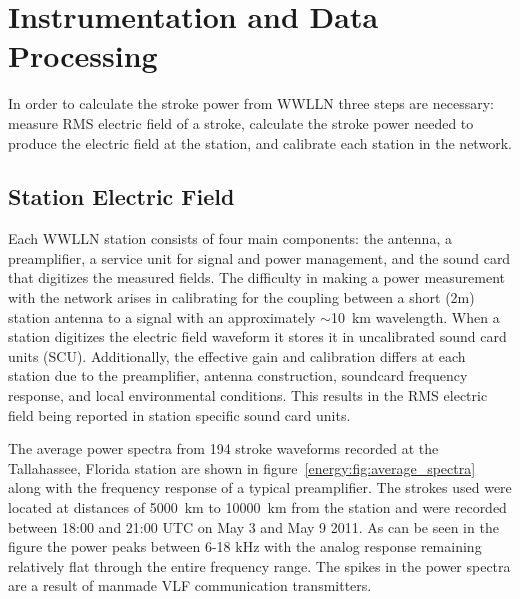 \section{Instrumentation and Data Processing}

In order to calculate the stroke power from WWLLN three steps are necessary: measure RMS electric field of a stroke, calculate the stroke power needed to produce the electric field at the station, and calibrate each station in the network.

\subsection{Station Electric Field}

Each WWLLN station consists of four main components: the antenna, a preamplifier, a service unit for signal and power management, and the sound card that digitizes the measured fields.
The difficulty in making a power measurement with the network arises in calibrating for the coupling between a short (2m) station antenna to a signal with an approximately $\sim$10~km wavelength.
When a station digitizes the electric field waveform it stores it in uncalibrated sound card units (SCU).
Additionally, the effective gain and calibration differs at each station due to the preamplifier, antenna construction, soundcard frequency response, and local environmental conditions.
This results in the RMS electric field being reported in station specific sound card units.

The average power spectra from 194 stroke waveforms recorded at the Tallahassee, Florida station are shown in figure~\ref{energy:fig:average_spectra} along with the frequency response of a typical preamplifier.
The strokes used were located at distances of 5000~km to 10000~km from the station and were recorded between 18:00 and 21:00 UTC on May 3 and May 9 2011.
As can be seen in the figure the power peaks between 6-18 kHz with the analog response remaining relatively flat through the entire frequency range.
The spikes in the power spectra are a result of manmade VLF communication transmitters.

